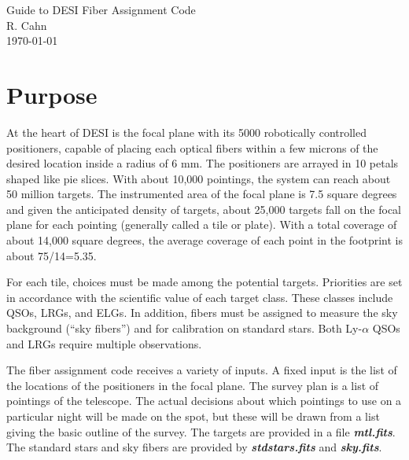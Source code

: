 \documentclass[12pt]{article}
\begin{document}
\def\begeq{\begin{equation}}
\def\endeq{\end{equation}}
\def\begeqar{\begin{eqnarray}}
\def\endeqar{\end{eqnarray}}
\def\half{\frac 12}
\def\non{\nonumber\\}
\def\fest{f_{est}}
\def\fnew{f^{new}_{est}}
\def\file#1{{\bf\it#1}}
\def\struc#1{{\bf #1}}
\def\func#1{{\it#1}\ }
\def\class#1{{\underline{\bf#1}}}
\def\var#1{{\underline{#1}}}
\begin{Large}
\begin{center}
Guide to DESI Fiber Assignment Code\\[0.2in]
R. Cahn\\[0.2in]
\today
\end{center}
\end{Large}
\section{Purpose}
At the heart of DESI is the focal plane with its 5000 robotically controlled positioners, capable of placing each optical fibers within a few microns of the desired location inside a radius of 6 mm. The positioners are arrayed in 10 petals shaped like pie slices.   With about 10,000 pointings, the system can reach about 50 million targets.  The instrumented area of the focal plane is 7.5 square degrees and given the anticipated density of targets, about 25,000 targets fall on the focal plane for each pointing (generally called a tile or plate).  With a total coverage of about 14,000 square degrees, the average coverage of each point in the footprint is about 75/14=5.35.



For each tile, choices must be made among the potential targets.  Priorities are set in accordance with the scientific value of each target class.  These classes include QSOs, LRGs, and ELGs.  In addition, fibers must be assigned to measure the sky background (``sky fibers'') and for calibration on standard stars. Both Ly-$\alpha$ QSOs and LRGs require multiple observations.

The fiber assignment code receives a variety of inputs. A fixed input is the list of the locations of the positioners in the focal plane.   The survey plan is a list of pointings of the telescope.  The actual decisions about which pointings to use on a particular night will be made on the spot, but these will be drawn from a list giving the basic outline of the survey.  The targets are provided in a file \file{mtl.fits}.  The standard stars and sky fibers are provided by \file{stdstars.fits} and \file{sky.fits}.  
\end{document}
